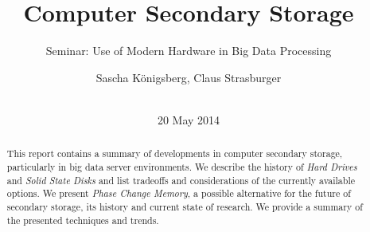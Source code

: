 \documentclass{acm_proc_article-sp}
\begin{document}
\title{Computer Secondary Storage}
\subtitle{Seminar: Use of Modern Hardware in Big Data Processing}
%
%
%
%
%

%
\author{
%
%
\alignauthor
Sascha K{\"o}nigsberg, Claus Strasburger\\
       \\
}

\date{20 May 2014}

\maketitle
\begin{abstract}
This report contains a summary of developments in computer secondary storage, particularly in big data server environments. We describe the history of \emph{Hard Drives} and \emph{Solid State Disks} and list tradeoffs and considerations of the currently available options. We present \emph{Phase Change Memory}, a possible alternative for the future of secondary storage, its history and current state of research. We provide a summary of the presented techniques and trends.%
\end{abstract}
\end{document}
